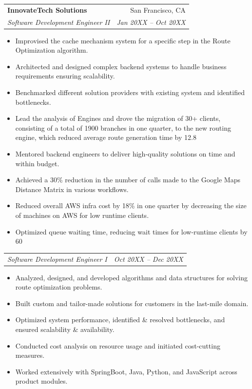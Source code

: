 \documentclass[letterpaper,10pt]{article}
\makeatletter
\newcommand{\resumeSubheading}[4]{
  \vspace{-1pt}\item
    \begin{tabular*}{0.97\textwidth}[t]{l@{\extracolsep{\fill}}r}
      \textbf{#1} & #2 \\
      \textit{\footnotesize#3} & \textit{\footnotesize #4} \\
    \end{tabular*}\vspace{-5pt}
}
\newcommand{\resumeSubSubheading}[2]{
    \begin{tabular*}{0.97\textwidth}{l@{\extracolsep{\fill}}r}
      \textit{\footnotesize#1} & \textit{\footnotesize #2} \\
    \end{tabular*}\vspace{-5pt}
}
\newcommand{\resumeItemListStart}{\begin{itemize}}
\newcommand{\resumeItemListEnd}{\end{itemize}\vspace{-5pt}}
\makeatother
\begin{document}
    \resumeSubheading
      {InnovateTech Solutions}{San Francisco, CA}
      {Software Development Engineer II}{Jan 20XX -- Oct 20XX}
      \resumeItemListStart
        \item \small Improvised the cache mechanism system for a specific step in the Route Optimization algorithm.
        \item \small Architected and designed complex backend systems to handle business requirements ensuring scalability.
        \item \small Benchmarked different solution providers with existing system and identified bottlenecks. 
        \item \small Lead the analysis of Engines and drove the migration of 30+ clients, consisting of a total of 1900 branches in one quarter, to the new routing engine, which reduced average route generation time by 12.8%
        \item \small Mentored backend engineers to deliver high-quality solutions on time and within budget.
        \item \small Achieved a 30\% reduction in the number of calls made to the Google Maps Distance Matrix in various workflows.
        \item \small Reduced overall AWS infra cost by 18\% in one quarter by decreasing the size of machines on AWS for low runtime clients.
        \item \small Optimized queue waiting time, reducing wait times for low-runtime clients by 60%
      \resumeItemListEnd

      \resumeSubSubheading{Software Development Engineer I}{Oct 20XX -- Dec 20XX}
      \resumeItemListStart
        \item \small Analyzed, designed, and developed algorithms and data structures for solving route optimization problems.
        \item \small Built custom and tailor-made solutions for customers in the last-mile domain.
        \item \small Optimized system performance, identified \& resolved bottlenecks, and ensured scalability \& availability.
        \item \small Conducted cost analysis on resource usage and initiated cost-cutting measures.
        \item \small Worked extensively with SpringBoot, Java, Python, and JavaScript across product modules.
      \resumeItemListEnd
\end{document}

